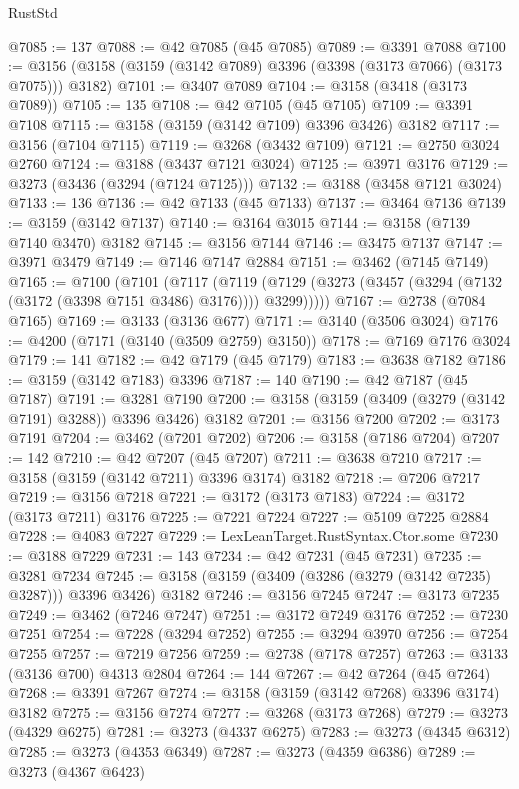 \begin{lexlean}{RustStd}
\begin{coremodule}
@7085 := 137
@7088 := @42 @7085 (@45 @7085)
@7089 := @3391 @7088
@7100 := @3156 (@3158 (@3159 (@3142 @7089) @3396 (@3398 (@3173 @7066) (@3173 @7075))) @3182)
@7101 := @3407 @7089
@7104 := @3158 (@3418 (@3173 @7089))
@7105 := 135
@7108 := @42 @7105 (@45 @7105)
@7109 := @3391 @7108
@7115 := @3158 (@3159 (@3142 @7109) @3396 @3426) @3182
@7117 := @3156 (@7104 @7115)
@7119 := @3268 (@3432 @7109)
@7121 := @2750 @3024 @2760
@7124 := @3188 (@3437 @7121 @3024)
@7125 := @3971 @3176
@7129 := @3273 (@3436 (@3294 (@7124 @7125)))
@7132 := @3188 (@3458 @7121 @3024)
@7133 := 136
@7136 := @42 @7133 (@45 @7133)
@7137 := @3464 @7136
@7139 := @3159 (@3142 @7137)
@7140 := @3164 @3015
@7144 := @3158 (@7139 @7140 @3470) @3182
@7145 := @3156 @7144
@7146 := @3475 @7137
@7147 := @3971 @3479
@7149 := @7146 @7147 @2884
@7151 := @3462 (@7145 @7149)
@7165 := @7100
    (@7101
      (@7117
        (@7119 (@7129 (@3273 (@3457 (@3294 (@7132 (@3172 (@3398 @7151 @3486) @3176)))) @3299)))))
@7167 := @2738 (@7084 @7165)
@7169 := @3133 (@3136 @677)
@7171 := @3140 (@3506 @3024)
@7176 := @4200 (@7171 (@3140 (@3509 @2759) @3150))
@7178 := @7169 @7176 @3024
@7179 := 141
@7182 := @42 @7179 (@45 @7179)
@7183 := @3638 @7182
@7186 := @3159 (@3142 @7183) @3396
@7187 := 140
@7190 := @42 @7187 (@45 @7187)
@7191 := @3281 @7190
@7200 := @3158 (@3159 (@3409 (@3279 (@3142 @7191) @3288)) @3396 @3426) @3182
@7201 := @3156 @7200
@7202 := @3173 @7191
@7204 := @3462 (@7201 @7202)
@7206 := @3158 (@7186 @7204)
@7207 := 142
@7210 := @42 @7207 (@45 @7207)
@7211 := @3638 @7210
@7217 := @3158 (@3159 (@3142 @7211) @3396 @3174) @3182
@7218 := @7206 @7217
@7219 := @3156 @7218
@7221 := @3172 (@3173 @7183)
@7224 := @3172 (@3173 @7211) @3176
@7225 := @7221 @7224
@7227 := @5109 @7225 @2884
@7228 := @4083 @7227
@7229 := LexLeanTarget.RustSyntax.Ctor.some
@7230 := @3188 @7229
@7231 := 143
@7234 := @42 @7231 (@45 @7231)
@7235 := @3281 @7234
@7245 := @3158 (@3159 (@3409 (@3286 (@3279 (@3142 @7235) @3287))) @3396 @3426) @3182
@7246 := @3156 @7245
@7247 := @3173 @7235
@7249 := @3462 (@7246 @7247)
@7251 := @3172 @7249 @3176
@7252 := @7230 @7251
@7254 := @7228 (@3294 @7252)
@7255 := @3294 @3970
@7256 := @7254 @7255
@7257 := @7219 @7256
@7259 := @2738 (@7178 @7257)
@7263 := @3133 (@3136 @700) @4313 @2804
@7264 := 144
@7267 := @42 @7264 (@45 @7264)
@7268 := @3391 @7267
@7274 := @3158 (@3159 (@3142 @7268) @3396 @3174) @3182
@7275 := @3156 @7274
@7277 := @3268 (@3173 @7268)
@7279 := @3273 (@4329 @6275)
@7281 := @3273 (@4337 @6275)
@7283 := @3273 (@4345 @6312)
@7285 := @3273 (@4353 @6349)
@7287 := @3273 (@4359 @6386)
@7289 := @3273 (@4367 @6423)

\end{coremodule}
\end{lexlean}
